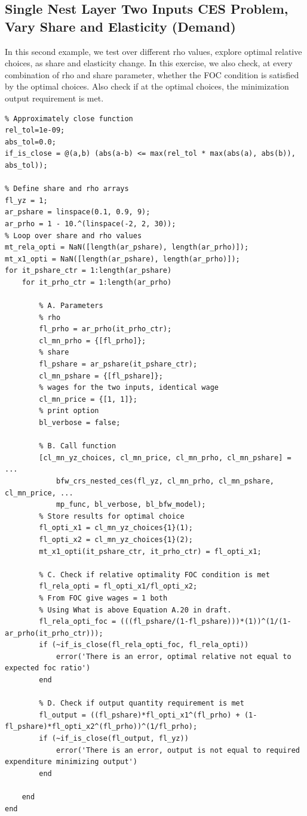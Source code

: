 \documentclass[
]{book}
\begin{document}
\hypertarget{single-nest-layer-two-inputs-ces-problem-vary-share-and-elasticity-demand}{%
\subsection{Single Nest Layer Two Inputs CES Problem, Vary Share and Elasticity (Demand)}\label{single-nest-layer-two-inputs-ces-problem-vary-share-and-elasticity-demand}}

In this second example, we test over different rho values, explore
optimal relative choices, as share and elasticity change. In this
exercise, we also check, at every combination of rho and share
parameter, whether the FOC condition is satisfied by the optimal
choices. Also check if at the optimal choices, the minimization output
requirement is met.

\begin{verbatim}
% Approximately close function
rel_tol=1e-09;
abs_tol=0.0;
if_is_close = @(a,b) (abs(a-b) <= max(rel_tol * max(abs(a), abs(b)), abs_tol));

% Define share and rho arrays
fl_yz = 1;
ar_pshare = linspace(0.1, 0.9, 9);
ar_prho = 1 - 10.^(linspace(-2, 2, 30));
% Loop over share and rho values
mt_rela_opti = NaN([length(ar_pshare), length(ar_prho)]);
mt_x1_opti = NaN([length(ar_pshare), length(ar_prho)]);
for it_pshare_ctr = 1:length(ar_pshare)
    for it_prho_ctr = 1:length(ar_prho)

        % A. Parameters
        % rho
        fl_prho = ar_prho(it_prho_ctr);
        cl_mn_prho = {[fl_prho]};
        % share
        fl_pshare = ar_pshare(it_pshare_ctr);
        cl_mn_pshare = {[fl_pshare]};
        % wages for the two inputs, identical wage
        cl_mn_price = {[1, 1]};
        % print option
        bl_verbose = false;

        % B. Call function
        [cl_mn_yz_choices, cl_mn_price, cl_mn_prho, cl_mn_pshare] = ...
            bfw_crs_nested_ces(fl_yz, cl_mn_prho, cl_mn_pshare, cl_mn_price, ...
            mp_func, bl_verbose, bl_bfw_model);
        % Store results for optimal choice
        fl_opti_x1 = cl_mn_yz_choices{1}(1);
        fl_opti_x2 = cl_mn_yz_choices{1}(2);
        mt_x1_opti(it_pshare_ctr, it_prho_ctr) = fl_opti_x1;

        % C. Check if relative optimality FOC condition is met
        fl_rela_opti = fl_opti_x1/fl_opti_x2;
        % From FOC give wages = 1 both
        % Using What is above Equation A.20 in draft.
        fl_rela_opti_foc = (((fl_pshare/(1-fl_pshare)))*(1))^(1/(1-ar_prho(it_prho_ctr)));
        if (~if_is_close(fl_rela_opti_foc, fl_rela_opti))
            error('There is an error, optimal relative not equal to expected foc ratio')
        end

        % D. Check if output quantity requirement is met
        fl_output = ((fl_pshare)*fl_opti_x1^(fl_prho) + (1-fl_pshare)*fl_opti_x2^(fl_prho))^(1/fl_prho);
        if (~if_is_close(fl_output, fl_yz))
            error('There is an error, output is not equal to required expenditure minimizing output')
        end

    end
end
\end{verbatim}
\end{document}

